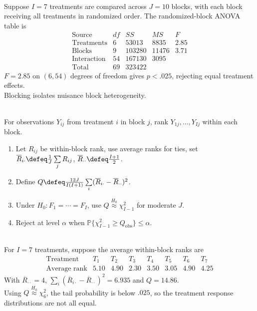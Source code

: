\begin{example} \label{ex:generic-randomized-block-anova} \\
Suppose $I=7$ treatments are compared across $J=10$ blocks, with each block receiving all treatments in randomized order. The randomized-block ANOVA table is
\[
\begin{array}{c|rrrr}
\text{Source} & df & SS & MS & F\\ \hline
\text{Treatments} & 6 & 53013 & 8835 & 2.85\\
\text{Blocks} & 9 & 103280 & 11476 & 3.71\\
\text{Interaction} & 54 & 167130 & 3095 & \\
\text{Total} & 69 & 323422 & &
\end{array}
\]
$F=2.85$ on $(6,54)$ degrees of freedom gives $p<.025$, rejecting equal treatment effects.\\
Blocking isolates nuisance block heterogeneity.
\end{example}

\begin{method} \label{meth:friedman-test} \\
For observations $Y_{ij}$ from treatment $i$ in block $j$, rank $Y_{1j},\ldots,Y_{Ij}$ within each block.
\begin{enumerate}[label=(\roman*)]
\setlength{\itemsep}{0pt}
\item Let $R_{ij}$ be within-block rank, use average ranks for ties, set $\overline{R}_{i\cdot}\defeq \frac{1}{J}\sum\limits_jR_{ij}$, $\overline{R}_{\cdot\cdot}\defeq\frac{I+1}{2}$.
\item Define $Q\defeq \frac{12J}{I(I+1)}\sum\limits_i(\overline{R}_{i\cdot}-\overline{R}_{\cdot\cdot})^2$.
\item Under $H_0:F_1=\cdots=F_I$, use $Q\overset{H_0}{\approx}\chi^2_{I-1}$ for moderate $J$.
\item Reject at level $\alpha$ when $\mathbb{P}\{\chi^2_{I-1}\geq Q_{\mathrm{obs}}\}\leq\alpha$.
\end{enumerate}
\end{method}

\begin{example} \label{ex:generic-friedman-rank-calculation} \\
For $I=7$ treatments, suppose the average within-block ranks are
\[
\begin{array}{c|rrrrrrr}
\text{Treatment} & T_1 & T_2 & T_3 & T_4 & T_5 & T_6 & T_7\\ \hline
\text{Average rank} & 5.10 & 4.90 & 2.30 & 3.50 & 3.05 & 4.90 & 4.25
\end{array}
\]
With $\overline{R}_{\cdot\cdot}=4$, $\sum_i(\overline{R}_{i\cdot}-\overline{R}_{\cdot\cdot})^2=6.935$ and $Q=14.86$.\\
Using $Q\overset{H_0}{\approx}\chi^2_6$, the tail probability is below $.025$, so the treatment response distributions are not all equal.
\end{example}

